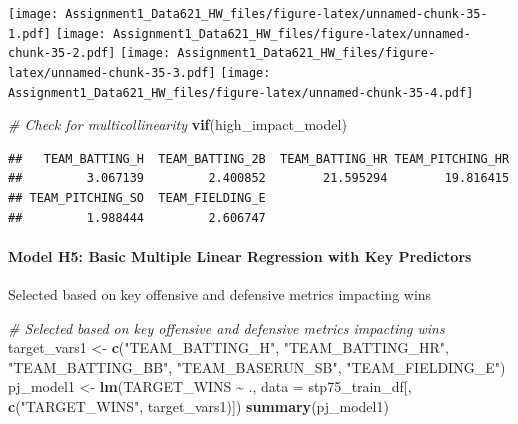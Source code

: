 \documentclass[
]{article}
\newenvironment{Shaded}{\begin{snugshade}}{\end{snugshade}}
\newcommand{\AttributeTok}[1]{\textcolor[rgb]{0.13,0.29,0.53}{#1}}
\newcommand{\CommentTok}[1]{\textcolor[rgb]{0.56,0.35,0.01}{\textit{#1}}}
\newcommand{\FunctionTok}[1]{\textcolor[rgb]{0.13,0.29,0.53}{\textbf{#1}}}
\newcommand{\NormalTok}[1]{#1}
\newcommand{\OtherTok}[1]{\textcolor[rgb]{0.56,0.35,0.01}{#1}}
\newcommand{\SpecialCharTok}[1]{\textcolor[rgb]{0.81,0.36,0.00}{\textbf{#1}}}
\newcommand{\StringTok}[1]{\textcolor[rgb]{0.31,0.60,0.02}{#1}}
\begin{document}
\texttt{[image: Assignment1\_Data621\_HW\_files/figure-latex/unnamed-chunk-35-1.pdf]}
\texttt{[image: Assignment1\_Data621\_HW\_files/figure-latex/unnamed-chunk-35-2.pdf]}
\texttt{[image: Assignment1\_Data621\_HW\_files/figure-latex/unnamed-chunk-35-3.pdf]}
\texttt{[image: Assignment1\_Data621\_HW\_files/figure-latex/unnamed-chunk-35-4.pdf]}

\begin{Shaded}
\begin{Highlighting}[]
\CommentTok{\# Check for multicollinearity}
\FunctionTok{vif}\NormalTok{(high\_impact\_model)}
\end{Highlighting}
\end{Shaded}

\begin{verbatim}
##   TEAM_BATTING_H  TEAM_BATTING_2B  TEAM_BATTING_HR TEAM_PITCHING_HR 
##         3.067139         2.400852        21.595294        19.816415 
## TEAM_PITCHING_SO  TEAM_FIELDING_E 
##         1.988444         2.606747
\end{verbatim}

\paragraph{Model H5: Basic Multiple Linear Regression with Key
Predictors}\label{model-h5-basic-multiple-linear-regression-with-key-predictors}

Selected based on key offensive and defensive metrics impacting wins

\begin{Shaded}
\begin{Highlighting}[]
\CommentTok{\# Selected based on key offensive and defensive metrics impacting wins}
\NormalTok{target\_vars1 }\OtherTok{\textless{}{-}} \FunctionTok{c}\NormalTok{(}\StringTok{"TEAM\_BATTING\_H"}\NormalTok{, }\StringTok{"TEAM\_BATTING\_HR"}\NormalTok{, }\StringTok{"TEAM\_BATTING\_BB"}\NormalTok{, }\StringTok{"TEAM\_BASERUN\_SB"}\NormalTok{, }\StringTok{"TEAM\_FIELDING\_E"}\NormalTok{)}
\NormalTok{pj\_model1 }\OtherTok{\textless{}{-}} \FunctionTok{lm}\NormalTok{(TARGET\_WINS }\SpecialCharTok{\textasciitilde{}}\NormalTok{ ., }\AttributeTok{data =}\NormalTok{ stp75\_train\_df[, }\FunctionTok{c}\NormalTok{(}\StringTok{"TARGET\_WINS"}\NormalTok{, target\_vars1)])}
\FunctionTok{summary}\NormalTok{(pj\_model1)}
\end{Highlighting}
\end{Shaded}
\end{document}
